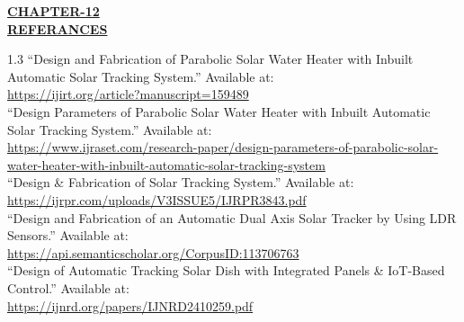 \documentclass[12pt,a4paper]{article}
\begin{document}

\begin{center}
  {\fontsize{15}{18}\selectfont \bfseries \textcolor{red!80!black}{\underline{CHAPTER-12}}}\\[2mm]
  {\fontsize{16}{20}\selectfont \bfseries \textcolor{red!80!black}{\underline{REFERANCES}}}\\[6mm]
\end{center}

\noindent
\begin{spacing}{1.3}
{\fontsize{10.2}{15}\selectfont
``Design and Fabrication of Parabolic Solar Water Heater with Inbuilt Automatic Solar Tracking System.'' Available at:\\[1mm]
\url{https://ijirt.org/article?manuscript=159489}\\[4mm]
``Design Parameters of Parabolic Solar Water Heater with Inbuilt Automatic Solar Tracking System.'' Available at:\\[1mm]
\url{https://www.ijraset.com/research-paper/design-parameters-of-parabolic-solar-water-heater-with-inbuilt-automatic-solar-tracking-system}\\[4mm]
``Design \& Fabrication of Solar Tracking System.'' Available at:\\[1mm]
\url{https://ijrpr.com/uploads/V3ISSUE5/IJRPR3843.pdf}\\[4mm]
``Design and Fabrication of an Automatic Dual Axis Solar Tracker by Using LDR Sensors.'' Available at:\\[1mm]
\url{https://api.semanticscholar.org/CorpusID:113706763}\\[4mm]
``Design of Automatic Tracking Solar Dish with Integrated Panels \& IoT-Based Control.'' Available at:\\[1mm]
\url{https://ijnrd.org/papers/IJNRD2410259.pdf}
}
\end{spacing}
\clearpage

\end{document}
